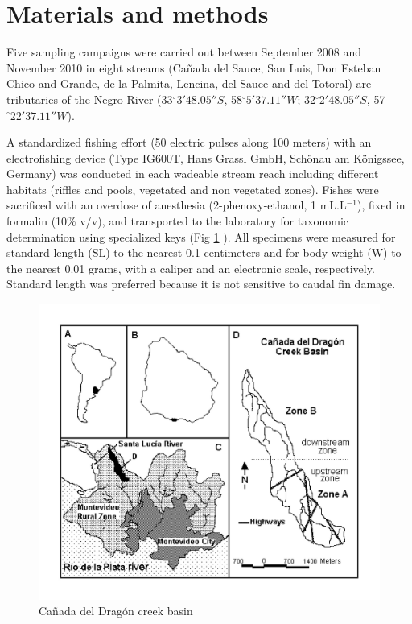 \documentclass[authoryear,preprint,review,12pt]{elsarticle} %
\begin{document}
\section{ Materials and methods}

Five sampling campaigns were carried out between September 2008 and November 2010 in eight streams (Ca\~{n}ada del Sauce, San Luis, Don Esteban Chico and Grande, de la Palmita, Lencina, del Sauce and del Totoral) are tributaries of the Negro River (33$\mathrm{{}^\circ}3'48.05''S$, 58$\mathrm{{}^\circ}5'37.11''W$; 32$\mathrm{{}^\circ}2'48.05''S$, 57$\mathrm{{}^\circ}22'37.11''W$).

A standardized fishing effort (50 electric pulses along 100 meters) with an electrofishing device (Type IG600T, Hans Grassl GmbH, Sch\"{o}nau am K\"{o}nigssee, Germany) was conducted in each wadeable stream reach including different habitats (riffles and pools, vegetated and non vegetated zones). Fishes were sacrificed with an overdose of anesthesia (2-phenoxy-ethanol, 1 mL.L${}^{-1}$), fixed in formalin (10\% v/v), and transported to the laboratory for taxonomic determination using specialized keys \citep{ringuelet1967peces,serra2014peces,teixeira2011peces} (Fig \ref{fig:fig-1} ). All specimens were measured for standard length (SL) to the nearest 0.1 centimeters and for body weight (W) to the nearest 0.01 grams, with a caliper and an electronic scale, respectively. Standard length was preferred because it is not sensitive to caudal fin damage.

\begin{figure}[h]
	\centering
	\includegraphics[width=0.7\linewidth]{"Fig 1"}
	\caption{Ca\~{n}ada del Drag\'on creek basin}
	\label{fig:fig-1}
\end{figure}
\end{document}
